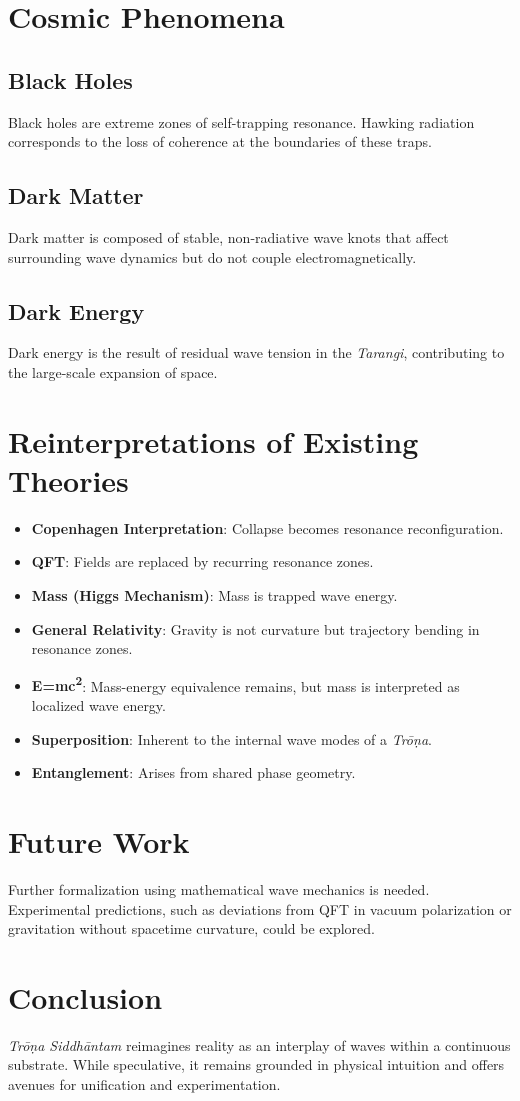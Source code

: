 \documentclass[12pt]{article}
\begin{document}
\section{Cosmic Phenomena}
\subsection{Black Holes}
Black holes are extreme zones of self-trapping resonance. Hawking radiation corresponds to the loss of coherence at the boundaries of these traps.

\subsection{Dark Matter}
Dark matter is composed of stable, non-radiative wave knots that affect surrounding wave dynamics but do not couple electromagnetically.

\subsection{Dark Energy}
Dark energy is the result of residual wave tension in the \textit{Tarangi}, contributing to the large-scale expansion of space.

\section{Reinterpretations of Existing Theories}
\begin{itemize}
    \item \textbf{Copenhagen Interpretation}: Collapse becomes resonance reconfiguration.
    \item \textbf{QFT}: Fields are replaced by recurring resonance zones.
    \item \textbf{Mass (Higgs Mechanism)}: Mass is trapped wave energy.
    \item \textbf{General Relativity}: Gravity is not curvature but trajectory bending in resonance zones.
    \item \textbf{E=mc\textsuperscript{2}}: Mass-energy equivalence remains, but mass is interpreted as localized wave energy.
    \item \textbf{Superposition}: Inherent to the internal wave modes of a \textit{Trōṇa}.
    \item \textbf{Entanglement}: Arises from shared phase geometry.
\end{itemize}

\section{Future Work}
Further formalization using mathematical wave mechanics is needed. Experimental predictions, such as deviations from QFT in vacuum polarization or gravitation without spacetime curvature, could be explored.

\section{Conclusion}
\textit{Trōṇa Siddhāntam} reimagines reality as an interplay of waves within a continuous substrate. While speculative, it remains grounded in physical intuition and offers avenues for unification and experimentation.



\end{document}
